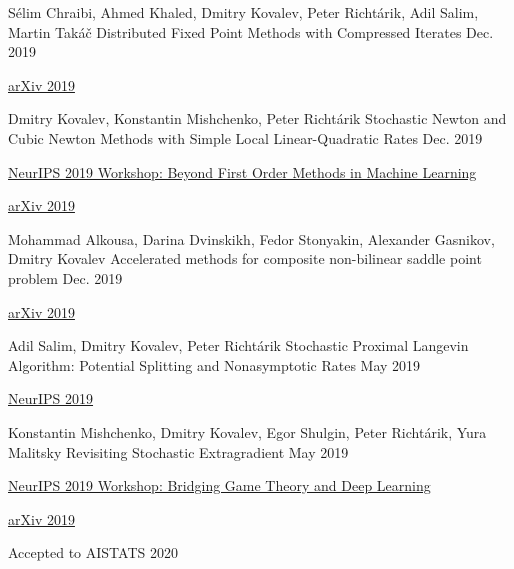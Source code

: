 
\begin{cventries}
	
\cventry
{Sélim Chraibi, Ahmed Khaled, Dmitry Kovalev, Peter Richtárik, Adil Salim, Martin Takáč} %
{Distributed Fixed Point Methods with Compressed Iterates} %
{} %
{Dec. 2019} %
{ %
	\begin{cvitems}
		\item {\href{https://arxiv.org/pdf/1912.09925.pdf}{arXiv 2019}}		
	\end{cvitems}
}	
	
\cventry
{Dmitry Kovalev, Konstantin Mishchenko, Peter Richtárik} %
{Stochastic Newton and Cubic Newton Methods with Simple Local Linear-Quadratic Rates} %
{} %
{Dec. 2019} %
{ %
	\begin{cvitems}
		\item {\href{https://sites.google.com/site/optneurips19/}{NeurIPS 2019 Workshop: Beyond First Order Methods in Machine Learning}}
		\item {\href{https://arxiv.org/pdf/1912.01597.pdf}{arXiv 2019}}		
	\end{cvitems}
}	

\cventry
{Mohammad Alkousa, Darina Dvinskikh, Fedor Stonyakin, Alexander Gasnikov, Dmitry Kovalev} %
{Accelerated methods for composite non-bilinear saddle point problem} %
{} %
{Dec. 2019} %
{ %
	\begin{cvitems}
		\item {\href{https://arxiv.org/abs/1906.03620}{arXiv 2019}}
	\end{cvitems}
}	

\cventry
{Adil Salim, Dmitry Kovalev, Peter Richtárik} %
{Stochastic Proximal Langevin Algorithm: Potential Splitting and Nonasymptotic Rates} %
{} %
{May 2019} %
{ %
	\begin{cvitems}
		\item {\href{https://papers.nips.cc/paper/8891-stochastic-proximal-langevin-algorithm-potential-splitting-and-nonasymptotic-rates}{NeurIPS 2019}}
	\end{cvitems}
}	
	
\cventry
{Konstantin Mishchenko, Dmitry Kovalev, Egor Shulgin, Peter Richtárik, Yura Malitsky} %
{Revisiting Stochastic Extragradient} %
{} %
{May 2019} %
{ %
	\begin{cvitems}
		\item {\href{https://sgo-workshop.github.io}{NeurIPS 2019 Workshop: Bridging Game Theory and Deep Learning}}
		\item {\href{https://arxiv.org/abs/1905.11373}{arXiv 2019}}
		\item Accepted to AISTATS 2020
	\end{cvitems}
}


\end{cventries}
